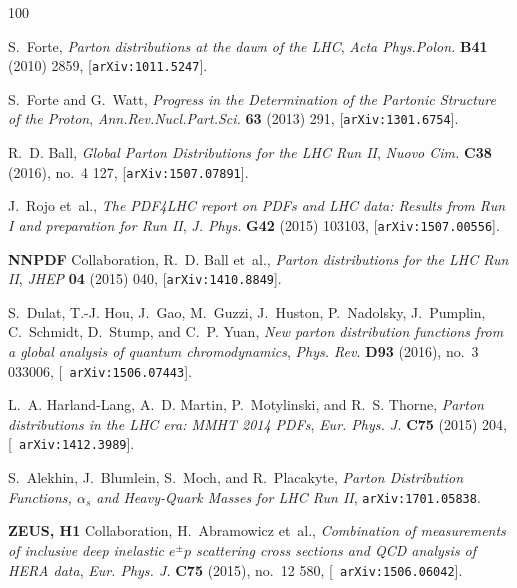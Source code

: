\providecommand{\href}[2]{#2}\begingroup\raggedright\begin{thebibliography}{100}

S.~Forte, {\it {Parton distributions at the dawn of the LHC}},  {\em Acta
  Phys.Polon.} {\bf B41} (2010) 2859,
  [\href{http://arxiv.org/abs/1011.5247}{{\tt arXiv:1011.5247}}].

S.~Forte and G.~Watt, {\it {Progress in the Determination of the Partonic
  Structure of the Proton}},  {\em Ann.Rev.Nucl.Part.Sci.} {\bf 63} (2013) 291,
  [\href{http://arxiv.org/abs/1301.6754}{{\tt arXiv:1301.6754}}].

R.~D. Ball, {\it {Global Parton Distributions for the LHC Run II}},  {\em Nuovo
  Cim.} {\bf C38} (2016), no.~4 127,
  [\href{http://arxiv.org/abs/1507.07891}{{\tt arXiv:1507.07891}}].

J.~Rojo et~al., {\it {The PDF4LHC report on PDFs and LHC data: Results from Run
  I and preparation for Run II}},  {\em J. Phys.} {\bf G42} (2015) 103103,
  [\href{http://arxiv.org/abs/1507.00556}{{\tt arXiv:1507.00556}}].

{\bf NNPDF} Collaboration, R.~D. Ball et~al., {\it {Parton distributions for
  the LHC Run II}},  {\em JHEP} {\bf 04} (2015) 040,
  [\href{http://arxiv.org/abs/1410.8849}{{\tt arXiv:1410.8849}}].

S.~Dulat, T.-J. Hou, J.~Gao, M.~Guzzi, J.~Huston, P.~Nadolsky, J.~Pumplin,
  C.~Schmidt, D.~Stump, and C.~P. Yuan, {\it {New parton distribution functions
  from a global analysis of quantum chromodynamics}},  {\em Phys. Rev.} {\bf
  D93} (2016), no.~3 033006, [\href{http://arxiv.org/abs/1506.07443}{{\tt
  arXiv:1506.07443}}].

L.~A. Harland-Lang, A.~D. Martin, P.~Motylinski, and R.~S. Thorne, {\it {Parton
  distributions in the LHC era: MMHT 2014 PDFs}},  {\em Eur. Phys. J.} {\bf
  C75} (2015) 204, [\href{http://arxiv.org/abs/1412.3989}{{\tt
  arXiv:1412.3989}}].

S.~Alekhin, J.~Blumlein, S.~Moch, and R.~Placakyte, {\it {Parton Distribution
  Functions, $\alpha_s$ and Heavy-Quark Masses for LHC Run II}},
  \href{http://arxiv.org/abs/1701.05838}{{\tt arXiv:1701.05838}}.

{\bf ZEUS, H1} Collaboration, H.~Abramowicz et~al., {\it {Combination of
  measurements of inclusive deep inelastic ${e^{\pm }p}$ scattering cross
  sections and QCD analysis of HERA data}},  {\em Eur. Phys. J.} {\bf C75}
  (2015), no.~12 580, [\href{http://arxiv.org/abs/1506.06042}{{\tt
  arXiv:1506.06042}}].


\end{thebibliography}
